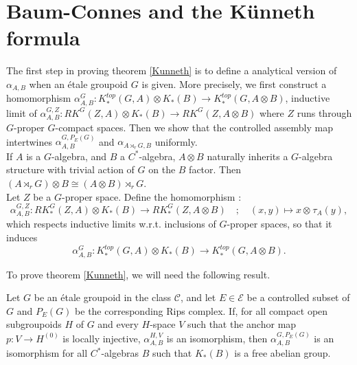 

\section{Baum-Connes and the Künneth formula}
The first step in proving theorem \ref{Kunneth} is to define a analytical version of $\alpha_{A,B}$ when an étale groupoid $G$ is given. More precisely, we first construct a homomorphism $\alpha_{A,B}^G : K_*^{top}(G,A)\otimes K_*(B)\rightarrow K_*^{top}(G,A\otimes B )$, inductive limit of $\alpha_{A,B}^{G,Z} : RK^G(Z,A)\otimes K_*(B)\rightarrow RK^G(Z,A\otimes B )$ where $Z$ runs through $G$-proper $G$-compact spaces. Then we show that the controlled assembly map intertwines $\alpha^{G,P_E(G)}_{A,B}$ and $\alpha_{A\rtimes_r G,B}$ uniformly.\\

If $A$ is a $G$-algebra, and $B$ a $C^*$-algebra, $A\otimes B$ naturally inherits a $G$-algebra structure with trivial action of $G$ on the $B$ factor. Then $(A\rtimes_r G)\otimes B \cong (A\otimes B)\rtimes_r G$.\\

Let $Z$ be a $G$-proper space. Define the homomorphism :
\[\alpha_{A,B}^{G,Z} : RK^G_*(Z,A)\otimes K_*(B)\rightarrow RK_*^G(Z,A\otimes B) \quad ; \quad (x,y)\mapsto x\otimes_{}   \tau_A(y),\]
which respects inductive limits w.r.t. inclusions of $G$-proper spaces, so that it induces
\[\alpha_{A,B}^G : K_*^{top}(G,A)\otimes K_*(B)\rightarrow K_*^{top}(G,A\otimes B ).\]

To prove theorem \ref{Kunneth}, we will need the following result.

\begin{thm}\label{TopologicalKunneth}
Let $G$ be an étale groupoid in the class $\mathcal C$, and let $E\in\mathcal E$ be a controlled subset of $G$ and $P_E(G)$ be the corresponding Rips complex. If, for all compact open subgroupoids $H$ of $G$ and every $H$-space $V$ such that the anchor map $p : V\rightarrow H^{(0)}$ is locally injective, $\alpha_{A,B}^{H,V}$ is an isomorphism, then $\alpha_{A,B}^{G,P_E(G)}$ is an isomorphism for all $C^*$-algebras $B$ such that $K_*(B)$ is a free abelian group.
\end{thm}

